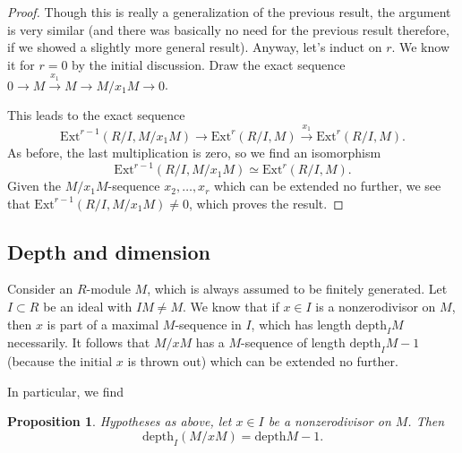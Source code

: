\documentclass{article}
\newtheorem{lemma}{Lemma}
\newtheorem{proposition}{Proposition}
\begin{document}
\begin{comment}
This will imply the other inequality and prove the theorem. 
For this we prove:
\begin{lemma} If $x_1, \dots, x_r$ is an $M$-sequence, then
$$\mathrm{Ext}^r(R/I, M) \simeq \hom(R/I, M/(x_1, \dots, x_r)M).$$
\end{lemma} 
This is actually more general than the previous lemma. In that case, we knew
that $x_1 \dots x_r$ could be extended, so there was an element of $I$ which
was a nonzerodivisor on $M/(x_1 \dots x_r) M$, so the hom-set on the left was
zero. 
\end{comment}
\begin{proof} 
Though this is really a generalization of the previous result, the argument is
very similar (and there was basically no need for the previous result
therefore, if we showed a slightly more general result). Anyway, let's induct
on $r$. We know it for $r=0$ by the initial discussion.
 Draw the exact sequence
$0 \to M \stackrel{x_1}{\to} M \to M/x_1 M\to 0$.  



This leads to the exact sequence
\[ \mathrm{Ext}^{r-1}(R/I, M/x_1 M) \to \mathrm{Ext}^r(R/I, M) \stackrel{x_1}{\to}
\mathrm{Ext}^r(R/I, M).  \]
As before, the last multiplication is zero, so we find an isomorphism
\[ \mathrm{Ext}^{r-1}(R/I, M/x_1 M) \simeq \mathrm{Ext}^r(R/I, M).  \]
Given the $M/x_1 M$-sequence $x_2, \dots, x_r$ which can be extended no
further, we see that $\mathrm{Ext}^{r-1}(R/I, M/x_1 M) \neq 0$, which proves the result.
\end{proof} 

\subsection{Depth and dimension}

Consider an $R$-module $M$, which is always assumed to be finitely generated.
Let $I \subset R$ be an ideal with $IM \neq M$. We know
that if $x \in I$ is a nonzerodivisor on $M$, then $x$ is part of a maximal
$M$-sequence in $I$, which has length $\mathrm{depth}_I M$ necessarily.
It follows that $M/xM$ has a $M$-sequence of length $\mathrm{depth}_I M - 1$ (because
the initial $x$ is thrown out) which can be extended no further.

In particular, we find
\begin{proposition} 
Hypotheses as above, let $x \in I$ be a nonzerodivisor on $M$. Then 
\[ \mathrm{depth}_I (M/xM) = \mathrm{depth} M - 1.  \]
\end{proposition} 
\end{document}
